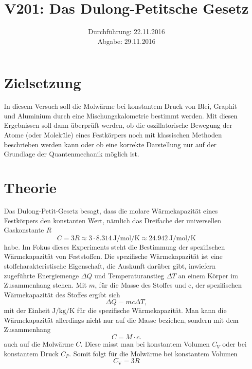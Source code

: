 \documentclass[
  bibliography=totoc,     %
  captions=tableheading,  %
  titlepage=firstiscover, %
]{scrartcl}
\title{V201: Das Dulong-Petitsche Gesetz}
\author{
  Simon Schulte
  \texorpdfstring{
    \\
    \href{mailto:simon.schulte@udo.edu}{simon.schulte@udo.edu}
  }{}
  \texorpdfstring{\and}{, }
  Tim Sedlaczek
  \texorpdfstring{
    \\
    \href{mailto:tim.sedlaczek@udo.edu}{tim.sedlaczek@udo.edu}
  }{}
}
\date{Durchführung: 22.11.2016\\
      Abgabe: 29.11.2016}
\begin{document}
\maketitle
\thispagestyle{empty}
\tableofcontents
\newpage
\section{Zielsetzung}
\label{sec:zielsetzung}
In diesem Versuch soll die Molwärme bei konstantem Druck von Blei, Graphit und
Aluminium durch eine Mischungskalometrie bestimmt werden. Mit diesen Ergebnissen
soll dann überprüft werden, ob die oszillatorische Bewegung der Atome
(oder Moleküle) eines Festkörpers noch mit klassischen Methoden beschrieben
werden kann oder ob eine korrekte Darstellung nur auf der Grundlage der
Quantenmechanik möglich ist.
\section{Theorie}
\label{sec:theorie}
Das Dulong-Petit-Gesetz besagt, dass die molare Wärmekapazität eines Festkörpers
den konstanten Wert, nämlich das Dreifache der universellen Gaskonstante $R$
\begin{equation}
  C=3R \approx 3 \cdot \SI{8.314}{\joule\per\mol\per\kelvin} \approx
  \SI{24.942}{\joule\per\mol\per\kelvin}
  \label{eqn:c-dulong}
\end{equation}
habe. Im Fokus dieses Experiments steht die Bestimmung der spezifischen
Wärmekapazität von Feststoffen. Die spezifische Wärmekapazität ist eine
stoffcharakteristische Eigenschaft, die Auskunft darüber gibt, inwiefern
zugeführte Energiemenge $\Delta Q$ und Temperaturanstieg $\Delta T$ an einem Körper im
Zusammenhang stehen. Mit $m$, für die Masse des Stoffes und c, der spezifischen
Wärmekapazität des Stoffes ergibt sich
\begin{equation}
  \Delta Q=mc\Delta T,
  \label{eqn:wärmemenge}
\end{equation}
mit der Einheit $\si{\joule\per\kilogram\per\kelvin}$
für die spezifische Wärmekapazität.
Man kann die Wärmekapazität allerdings nicht
nur auf die Masse beziehen, sondern mit dem Zusammenhang
\begin{equation}
  C=M \cdot c.
  \label{eqn:C}
\end{equation}
auch auf die Molwärme $C$. Diese misst man bei konstantem Volumen $C_V$ oder bei
konstantem Druck $C_P$.
Somit folgt für die Molwärme bei konstantem Volumen
\begin{equation}
  C_{\mathup{V}}=3R
  \label{eqn:Cv-dulong}
\end{equation}
\end{document}
